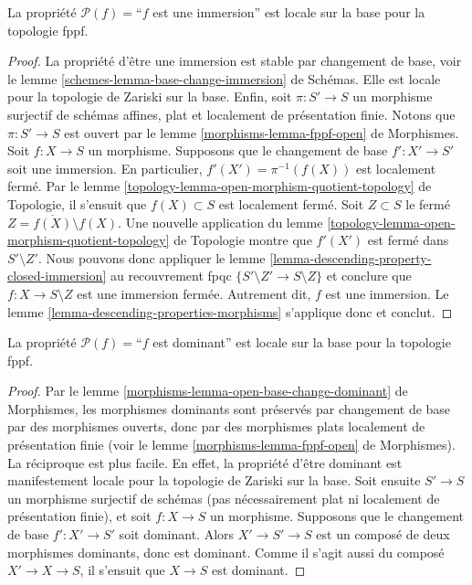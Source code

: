 \begin{lemma}
\label{lemma-descending-fppf-property-immersion}
La propriété $\mathcal{P}(f) =$``$f$ est une immersion''
est locale sur la base pour la topologie fppf.
\end{lemma}

\begin{proof}
La propriété d'être une immersion est stable par changement de base,
voir le lemme \ref{schemes-lemma-base-change-immersion} de Schémas.
Elle est locale pour la topologie de Zariski sur la base.
Enfin, soit
$\pi : S' \to S$ un morphisme surjectif de schémas affines,
plat et localement de présentation finie.
Notons que $\pi : S' \to S$ est ouvert par
le lemme \ref{morphisms-lemma-fppf-open} de Morphismes.
Soit $f : X \to S$ un morphisme.
Supposons que le changement de base $f' : X' \to S'$ soit une immersion.
En particulier, $f'(X') = \pi^{-1}(f(X))$ est localement fermé.
Par le lemme \ref{topology-lemma-open-morphism-quotient-topology} de Topologie,
il s'ensuit que $f(X) \subset S$
est localement fermé. Soit $Z \subset S$
le fermé $Z = \overline{f(X)} \setminus f(X)$.
Une nouvelle application du lemme
\ref{topology-lemma-open-morphism-quotient-topology} de Topologie
montre que $f'(X')$ est fermé dans $S' \setminus Z'$.
Nous pouvons donc appliquer le
lemme \ref{lemma-descending-property-closed-immersion}
au recouvrement fpqc $\{S' \setminus Z' \to S \setminus Z\}$
et conclure que $f : X \to S \setminus Z$ est une immersion fermée.
Autrement dit, $f$ est une immersion.
Le lemme \ref{lemma-descending-properties-morphisms} s'applique donc et conclut.
\end{proof}

\begin{lemma}
\label{lemma-descending-fppf-property-dominant}
La propriété $\mathcal{P}(f) =$``$f$ est dominant''
est locale sur la base pour la topologie fppf.
\end{lemma}

\begin{proof}
Par le lemme \ref{morphisms-lemma-open-base-change-dominant} de Morphismes,
les morphismes dominants sont préservés
par changement de base par des morphismes ouverts, donc
par des morphismes plats localement de présentation finie
(voir le lemme \ref{morphisms-lemma-fppf-open} de Morphismes).
La réciproque est plus facile.
En effet, la propriété d'être dominant est manifestement locale pour la
topologie de Zariski sur la base.
Soit ensuite $S' \to S$ un morphisme surjectif de schémas
(pas nécessairement plat ni localement de présentation finie),
et soit $f : X \to S$ un morphisme. Supposons que le changement de base
$f' : X' \to S'$ soit dominant. Alors $X' \to S'\to S$ est un composé
de deux morphismes dominants, donc est dominant. Comme il s'agit aussi du
composé $X' \to X \to S$, il s'ensuit que $X\to S$ est dominant.
\end{proof}






